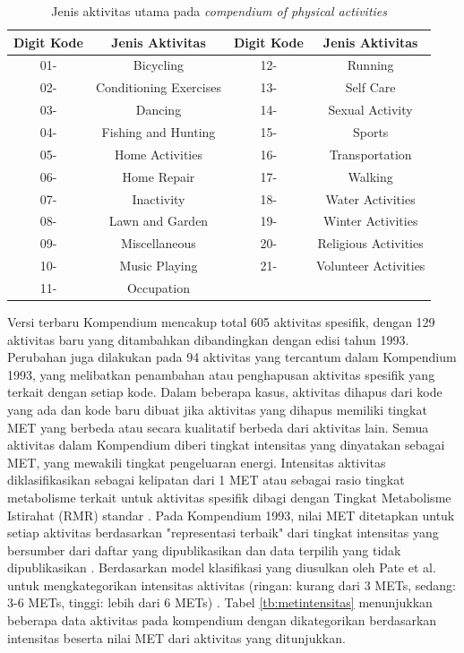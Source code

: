 \begin{longtable}{|c|c|c|c|}
  \caption{Jenis aktivitas utama pada \emph{compendium of physical activities}}
  \label{tb:metjenisaktivitas}  \\
  \hline
  \rowcolor[HTML]{C0C0C0}
  \textbf{Digit Kode} & \textbf{Jenis Aktivitas} & \textbf{Digit Kode} & \textbf{Jenis Aktivitas} \\
  \hline
  01-     & Bicycling                 & 12-    & Running     \\
  \hline
  02-     & Conditioning Exercises    & 13-    & Self Care     \\
  \hline
  03-     & Dancing                   & 14-    & Sexual Activity     \\
  \hline
  04-     & Fishing and Hunting       & 15-    & Sports    \\
  \hline
  05-     & Home Activities           & 16-    & Transportation     \\
  \hline
  06-     & Home Repair               & 17-    & Walking    \\
  \hline
  07-     & Inactivity                & 18-    & Water Activities    \\
  \hline
  08-     & Lawn and Garden           & 19-    & Winter Activities    \\
  \hline
  09-     & Miscellaneous             & 20-    & Religious Activities    \\
  \hline
  10-     & Music Playing             & 21-    & Volunteer Activities    \\
  \hline
  11-     & Occupation                &        &     \\
  \hline
\end{longtable}

Versi terbaru Kompendium mencakup total 605 aktivitas spesifik, dengan 129 aktivitas baru yang ditambahkan dibandingkan dengan edisi tahun 1993. Perubahan juga dilakukan pada 94 aktivitas yang tercantum dalam Kompendium 1993, yang melibatkan penambahan atau penghapusan aktivitas spesifik yang terkait dengan setiap kode. Dalam beberapa kasus, aktivitas dihapus dari kode yang ada dan kode baru dibuat jika aktivitas yang dihapus memiliki tingkat MET yang berbeda atau secara kualitatif berbeda dari aktivitas lain. Semua aktivitas dalam Kompendium diberi tingkat intensitas yang dinyatakan sebagai MET, yang mewakili tingkat pengeluaran energi. Intensitas aktivitas diklasifikasikan sebagai kelipatan dari 1 MET atau sebagai rasio tingkat metabolisme terkait untuk aktivitas spesifik dibagi dengan Tingkat Metabolisme Istirahat (RMR) standar \parencite{Ainsworth2}. Pada Kompendium 1993, nilai MET ditetapkan untuk setiap aktivitas berdasarkan "representasi terbaik" dari tingkat intensitas yang bersumber dari daftar yang dipublikasikan dan data terpilih yang tidak dipublikasikan \parencite{Ainsworth}.  Berdasarkan model klasifikasi yang diusulkan oleh Pate et al. untuk mengkategorikan intensitas aktivitas (ringan: kurang dari 3 METs, sedang: 3-6 METs, tinggi: lebih dari 6 METs) \parencite{Pate}. Tabel \ref{tb:metintensitas} menunjukkan beberapa data aktivitas pada kompendium dengan dikategorikan berdasarkan intensitas beserta nilai MET dari aktivitas yang ditunjukkan.

